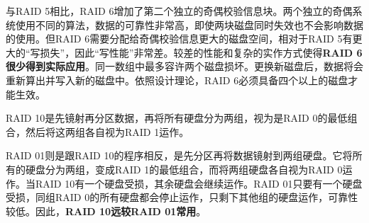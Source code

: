 与RAID 5相比，RAID 6增加了第二个独立的奇偶校验信息块。两个独立的奇偶系统使用不同的算法，数据的可靠性非常高，即使两块磁盘同时失效也不会影响数据的使用。但RAID 6需要分配给奇偶校验信息更大的磁盘空间，相对于RAID 5有更大的“写损失”，因此“写性能”非常差。较差的性能和复杂的实作方式使得\textbf{RAID 6很少得到实际应用}。同一数组中最多容许两个磁盘损坏。更换新磁盘后，数据将会重新算出并写入新的磁盘中。依照设计理论，RAID 6必须具备四个以上的磁盘才能生效。


RAID 10是先镜射再分区数据，再将所有硬盘分为两组，视为是RAID 0的最低组合，然后将这两组各自视为RAID 1运作。

RAID 01则是跟RAID 10的程序相反，是先分区再将数据镜射到两组硬盘。它将所有的硬盘分为两组，变成RAID 1的最低组合，而将两组硬盘各自视为RAID 0运作。当RAID 10有一个硬盘受损，其余硬盘会继续运作。RAID 01只要有一个硬盘受损，同组RAID 0的所有硬盘都会停止运作，只剩下其他组的硬盘运作，可靠性较低。因此，\textbf{RAID 10远较RAID 01常用}。



\clearpage


